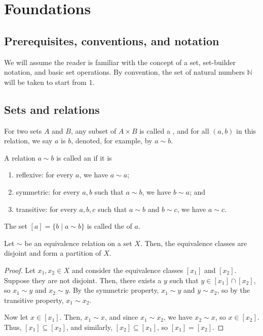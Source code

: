 \chapter{Foundations}

\section{Prerequisites, conventions, and notation}

We will assume the reader is familiar with the concept of a set, set-builder notation, and basic set operations. By convention, the set of natural numbers $ \mathbb{N} $ will be taken to start from $ 1 $.

\section{Sets and relations}

\begin{defn}
For two sets $ A $ and $ B $, any subset of $ A\times B $ is called a , and for all $ (a,b) $ in this relation, we say $ a $ is  $ b $, denoted, for example, by $ a\sim b $.
\end{defn}

\begin{defn}\label{defn:equiv_relation}
A relation $ a\sim b $ is called an  if it is
\begin{enumerate}
    \item reflexive: for every $ a $, we have $ a\sim a $;
    \item symmetric: for every $ a,b $ such that $ a\sim b $, we have $ b\sim a $; and
    \item transitive: for every $ a,b,c $ such that $ a\sim b $ and $ b\sim c $, we have $ a\sim c $.
\end{enumerate}
\end{defn}

\begin{defn}
The set $ [a]=\{b\mid a\sim b\} $ is called the  of $ a $.
\end{defn}

\begin{thm}
Let $ \sim $ be an equivalence relation on a set $ X $. Then, the equivalence classes are disjoint and form a partition of $ X $.
\end{thm}
\begin{proof}
Let $ x_1,x_2\in X $ and consider the equivalence classes $ [x_1] $ and $ [x_2] $. Suppose they are not disjoint. Then, there exists a $ y $ such that $ y\in[x_1]\cap[x_2] $, so $ x_1\sim y $ and $ x_2\sim y $. By the symmetric property, $ x_1\sim y $ and $ y\sim x_2 $, so by the transitive property, $ x_1\sim x_2 $.

Now let $ x\in[x_1] $. Then, $ x_1\sim x $, and since $ x_1\sim x_2 $, we have $ x_2\sim x $, so $ x\in[x_2] $. Thus, $ [x_1]\subseteq[x_2] $, and similarly, $ [x_2]\subseteq[x_1] $, so $ [x_1]=[x_2] $.
\end{proof}

